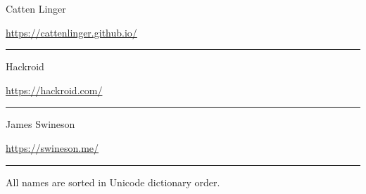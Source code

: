 


\newcommand{\sgitem}[2]{
    \noindent%
        \parbox[t][15mm][t]{\linewidth}{%
            \rmfamily\Large\mdseries\myvphantom#1\par
            \ttfamily\small\mdseries\myvphantom\href{#2}{#2}\par
        }\par
        \hrule\vskip 6mm
}



\sgitem{Catten Linger}{https://cattenlinger.github.io/}
\sgitem{Hackroid}{https://hackroid.com/}
\sgitem{James Swineson}{https://swineson.me/}

\vfill\small\rmfamily
All names are sorted in Unicode dictionary order.





